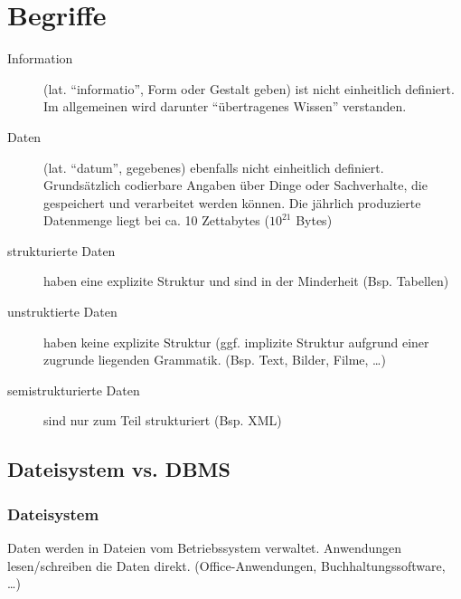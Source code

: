 \section{Begriffe}
\begin{description}
 \item [Information] (lat. \enquote{informatio}, Form oder Gestalt geben) ist nicht einheitlich
 definiert. Im allgemeinen wird darunter \enquote{übertragenes Wissen} verstanden.
 \item [Daten] (lat. \enquote{datum}, gegebenes) ebenfalls nicht einheitlich definiert. Grundsätzlich
 codierbare Angaben über Dinge oder Sachverhalte, die gespeichert und verarbeitet werden können.
 Die jährlich produzierte Datenmenge liegt bei ca. 10 Zettabytes ($10^{21}$ Bytes)
 \item [strukturierte Daten] haben eine explizite Struktur und sind in der Minderheit (Bsp. Tabellen)
 \item [unstruktierte Daten] haben keine explizite Struktur (ggf. implizite Struktur aufgrund einer
 zugrunde liegenden Grammatik. (Bsp. Text, Bilder, Filme, \dots)
 \item [semistrukturierte Daten] sind nur zum Teil strukturiert (Bsp. XML)
\end{description}

\subsection{Dateisystem vs. DBMS}
\subsubsection{Dateisystem}
Daten werden in Dateien vom Betriebssystem verwaltet. Anwendungen lesen/schreiben die Daten direkt. (Office-Anwendungen,
Buchhaltungssoftware, \dots)


